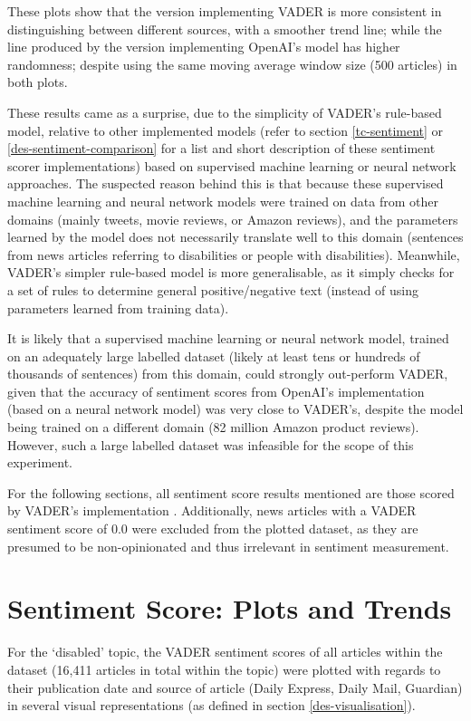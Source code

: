 \documentclass{report}
\begin{document}
These plots show that the version implementing VADER is more consistent in distinguishing between different sources, with a smoother trend line; while the line produced by the version implementing OpenAI's model has higher randomness; despite using the same moving average window size (500 articles) in both plots.

These results came as a surprise, due to the simplicity of VADER's rule-based model, relative to other implemented models (refer to section \ref{tc-sentiment} or \ref{des-sentiment-comparison} for a list and short description of these sentiment scorer implementations) based on supervised machine learning or neural network approaches.
The suspected reason behind this is that because these supervised machine learning and neural network models were trained on data from other domains (mainly tweets, movie reviews, or Amazon reviews), and the parameters learned by the model does not necessarily translate well to this domain (sentences from news articles referring to disabilities or people with disabilities). 
Meanwhile, VADER's simpler rule-based model is more generalisable, as it simply checks for a set of rules to determine general positive/negative text (instead of using parameters learned from training data).

It is likely that a supervised machine learning or neural network model, trained on an adequately large labelled dataset (likely at least tens or hundreds of thousands of sentences) from this domain, could strongly out-perform VADER, given that the accuracy of sentiment scores from OpenAI's implementation (based on a neural network model) was very close to VADER's, despite the model being trained on a different domain (82 million Amazon product reviews). 
However, such a large labelled dataset was infeasible for the scope of this experiment.

For the following sections, all sentiment score results mentioned are those scored by VADER's implementation \cite{VADER}.
Additionally, news articles with a VADER sentiment score of 0.0 were excluded from the plotted dataset, as they are presumed to be non-opinionated and thus irrelevant in sentiment measurement.

\section{Sentiment Score: Plots and Trends} \label{Sentiment score: plots and trends}
For the `disabled' topic, the VADER sentiment scores of all articles within the dataset (16,411 articles in total within the topic) were plotted with regards to their publication date and source of article (Daily Express, Daily Mail, Guardian) in several visual representations (as defined in section \ref{des-visualisation}).
\end{document}
